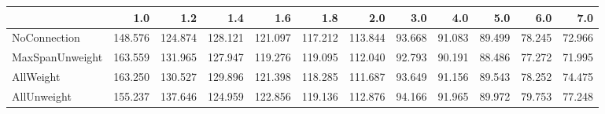 \begin{tabular}{lrrrrrrrrrrr}
\toprule
{} &     1.0 &     1.2 &     1.4 &     1.6 &     1.8 &     2.0 &    3.0 &    4.0 &    5.0 &    6.0 &    7.0 \\
\midrule
NoConnection    & 148.576 & 124.874 & 128.121 & 121.097 & 117.212 & 113.844 & 93.668 & 91.083 & 89.499 & 78.245 & 72.966 \\
MaxSpanUnweight & 163.559 & 131.965 & 127.947 & 119.276 & 119.095 & 112.040 & 92.793 & 90.191 & 88.486 & 77.272 & 71.995 \\
AllWeight       & 163.250 & 130.527 & 129.896 & 121.398 & 118.285 & 111.687 & 93.649 & 91.156 & 89.543 & 78.252 & 74.475 \\
AllUnweight     & 155.237 & 137.646 & 124.959 & 122.856 & 119.136 & 112.876 & 94.166 & 91.965 & 89.972 & 79.753 & 77.248 \\
\bottomrule
\end{tabular}
